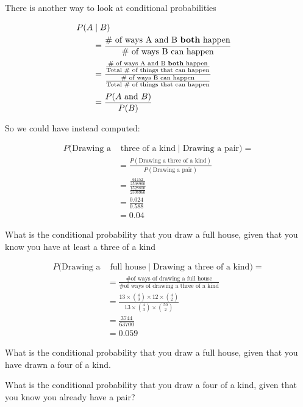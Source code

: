 %
\begin{frame}

There is another way to look at conditional probabilities

\begin{align*}
P(A & \mid B) & \\
%
&= \frac{\text{\# of ways A and B \textbf{both} happen}}{\text{\#
of ways B can happen}} \\[0.5ex]
%
&= \frac{\frac{\text{\# of ways A and B \textbf{both} happen}}{\text{Total \# of
things that can happen}}}{\frac{\text{\# of ways B can happen}}{\text{Total \# of
things that can happen}}} \\[0.5ex]
%
&= \frac{P(A \text{ and } B)}{P(B)}
\end{align*}

\end{frame}
%

%
\begin{frame}

So we could have instead computed:

\begin{align*}
P(\text{Drawing a} & \text{ three of a kind} \mid \text{Drawing a pair}) = \\
%
&= \frac{P(\text{Drawing a three of a kind})}{P(\text{Drawing a pair})} \\
%
&= \frac{\frac{61152}{2598960}}{\frac{1528800}{2598960}} \\
%
&= \frac{0.024}{0.588} \\
%
&= 0.04
\end{align*}

\end{frame}
%

%
\begin{frame}

What is the conditional probability that you draw a full house, given that you know you
have at least a three of a kind

\begin{align*}
P(\text{Drawing a} & \text{ full house} \mid \text{Drawing a three of a kind}) = \\
%
&= \frac{\text{\# of ways of drawing a full house}}{\text{\# of ways of drawing
a three of a kind}} \\
%
&= \frac{ 13 \times {{4}\choose{3}} \times 12 \times {{4}\choose{2}} } {13
\times {{4}\choose{3}} \times {{50}\choose{2}}} \\
%
&= \frac{3744}{63700} \\
%
&= 0.059
\end{align*}

\end{frame}
%

%
\begin{frame}
What is the conditional probability that you draw a full house, given that you
have drawn a four of a kind.

What is the conditional probability that you draw a four of a kind, given that
you know you already have a pair?
\end{frame}
